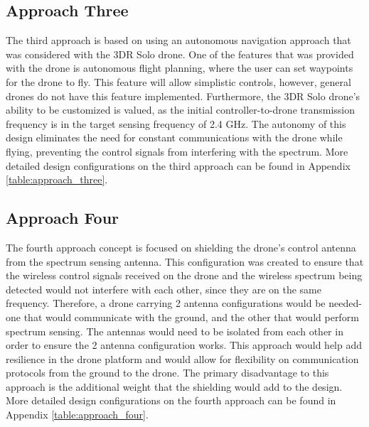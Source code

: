 \subsection{Approach Three}
The third approach is based on using an autonomous navigation approach that was considered with the 3DR Solo drone. One of the features that was provided with the drone is autonomous flight planning, where the user can set waypoints for the drone to fly. This feature will allow simplistic controls, however, general drones do not have this feature implemented. Furthermore, the 3DR Solo drone’s ability to be customized is valued, as the initial controller-to-drone transmission frequency is in the target sensing frequency of 2.4 GHz. The autonomy of this design eliminates the need for constant communications with the drone while flying, preventing the control signals from interfering with the spectrum. More detailed design configurations on the third approach can be found in Appendix \ref{table:approach_three}.

\subsection{Approach Four}
The fourth approach concept is focused on shielding the drone’s control antenna from the spectrum sensing antenna. This configuration was created to ensure that the wireless control signals received on the drone and the wireless spectrum being detected would not interfere with each other, since they are on the same frequency. Therefore, a drone carrying 2 antenna configurations would be needed- one that would communicate with the ground, and the other that would perform spectrum sensing. The antennas would need to be isolated from each other in order to ensure the 2 antenna configuration works. This approach would help add resilience in the drone platform and would allow for flexibility on communication protocols from the ground to the drone. The primary disadvantage to this approach is the additional weight that the shielding would add to the design. More detailed design configurations on the fourth approach can be found in Appendix \ref{table:approach_four}.

